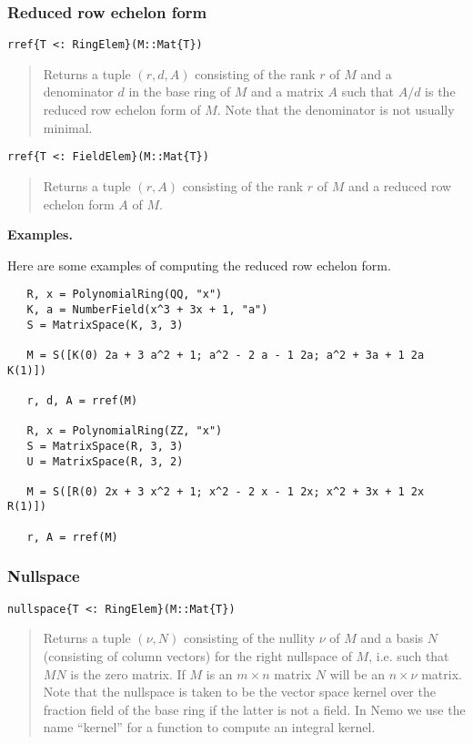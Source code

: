 \documentclass[a4paper,10pt]{article}
\newcommand{\desc}[1]{\vspace{-3mm}\begin{quote}#1\end{quote}}
\begin{document}
\subsubsection{Reduced row echelon form}

\begin{lstlisting}
rref{T <: RingElem}(M::Mat{T})
\end{lstlisting}

\desc{Returns a tuple $(r, d, A)$ consisting of the rank $r$ of $M$ and a
denominator $d$ in the base ring of $M$ and a matrix $A$ such that $A/d$ is
the reduced row echelon form of $M$. Note that the denominator is not
usually minimal.}

\begin{lstlisting}
rref{T <: FieldElem}(M::Mat{T})
\end{lstlisting}

\desc{Returns a tuple $(r, A)$ consisting of the rank $r$ of $M$ and a
reduced row echelon form $A$ of $M$.}

\textbf{Examples.}

Here are some examples of computing the reduced row echelon form.

\begin{lstlisting}
   R, x = PolynomialRing(QQ, "x")
   K, a = NumberField(x^3 + 3x + 1, "a")
   S = MatrixSpace(K, 3, 3)
   
   M = S([K(0) 2a + 3 a^2 + 1; a^2 - 2 a - 1 2a; a^2 + 3a + 1 2a K(1)])
   
   r, d, A = rref(M)

   R, x = PolynomialRing(ZZ, "x")
   S = MatrixSpace(R, 3, 3)
   U = MatrixSpace(R, 3, 2)

   M = S([R(0) 2x + 3 x^2 + 1; x^2 - 2 x - 1 2x; x^2 + 3x + 1 2x R(1)])
   
   r, A = rref(M)
\end{lstlisting}

\subsubsection{Nullspace}

\begin{lstlisting}
nullspace{T <: RingElem}(M::Mat{T})
\end{lstlisting}

\desc{Returns a tuple $(\nu, N)$ consisting of the nullity $\nu$ of $M$ and
a basis $N$ (consisting of column vectors) for the right nullspace of $M$,
i.e. such that $MN$ is the zero matrix. If $M$ is an $m\times n$ matrix
$N$ will be an $n\times \nu$ matrix. Note that the nullspace is taken to be
the vector space kernel over the fraction field of the base ring if the
latter is not a field. In Nemo we use the name ``kernel'' for a function to
compute an integral kernel.}
\end{document}
